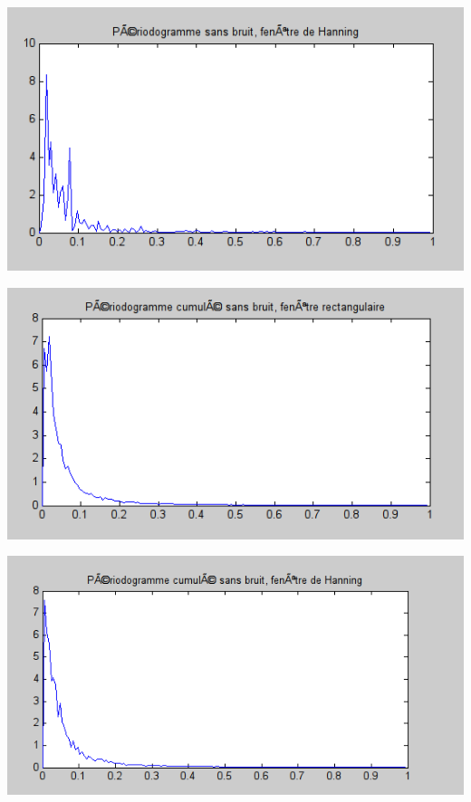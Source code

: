 \documentclass{beamer}
\begin{document}
\begin{frame}
\begin{center}
\includegraphics[scale=0.4]{capture/F.png}
\end{center}
\end{frame}

\begin{frame}
\begin{center}
\includegraphics[scale=0.4]{capture/G.png}
\end{center}
\end{frame}

\begin{frame}
\begin{center}
\includegraphics[scale=0.4]{capture/H.png}
\end{center}
\end{frame}
\end{document}
